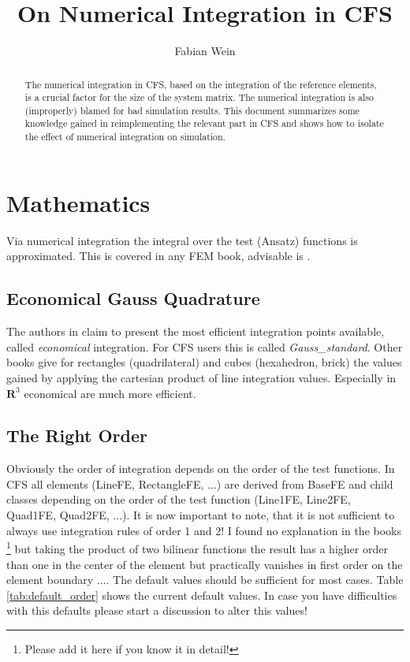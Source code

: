\documentclass[a4paper,10pt]{article}
\title{On Numerical Integration in CFS}
\author{Fabian Wein}
\begin{document}
\maketitle

\begin{abstract}
The numerical integration in CFS, based on the integration of the reference
elements, is a crucial factor for the
size of the system matrix. The numerical integration is also (improperly) blamed for
bad simulation results. This document summarizes some knowledge gained in reimplementing the relevant part in CFS and shows how to isolate the
effect of numerical integration on simulation.
\end{abstract}

\section{Mathematics}
Via numerical integration the integral over the test (Ansatz) functions is 
approximated. This is covered in any FEM book, advisable is \cite{Solin04}.  

\subsection{Economical Gauss Quadrature}
The authors in \cite{Solin04} claim to present the most efficient integration points available, called \textit{economical} integration. For CFS users this is called \textit{Gauss\_standard}. Other books give for rectangles (quadrilateral) and cubes (hexahedron, brick) the values
gained by applying the cartesian product of line integration values. Especially in 
$\mathbf{R}^3$ economical are much more efficient.
\subsection{The Right Order}
Obviously the order of integration depends on the order of the test functions. 
In CFS
all elements (LineFE, RectangleFE, ...) are derived from BaseFE and child classes depending on the order of the test function (Line1FE, Line2FE, Quad1FE, Quad2FE, ...). It is now
important to note, that it is not sufficient to always use integration rules of order 1 and 2! I found no explanation in the books \footnote{Please add it here if you know it in detail!} but taking the product of two bilinear functions the result has a higher order than one in the center of the element but practically vanishes in first order on the element boundary $\ldots$. The default values should be sufficient for most cases. Table \ref{tab:default_order} shows the current default values. In case you have difficulties with this defaults please start a discussion to alter this values!
\end{document}

